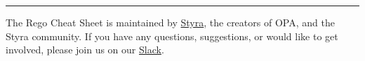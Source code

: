 \begin{center}\rule{0.5\linewidth}{0.5pt}\end{center}

The Rego Cheat Sheet is maintained by \href{http://styra.com}{Styra},
the creators of OPA, and the Styra community.
If you have any questions, suggestions, or would like to
get involved, please join us on our
\href{https://inviter.co/styra}{Slack}.